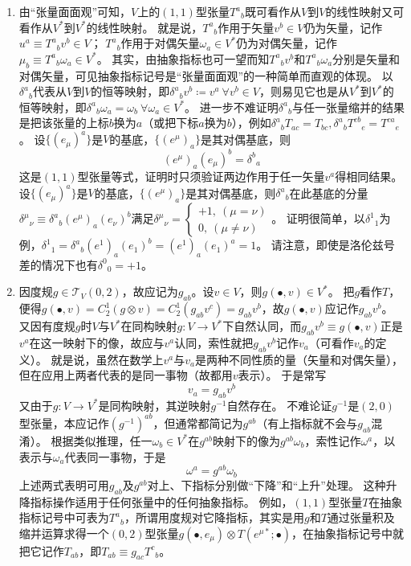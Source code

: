 \begin{enumerate}[1.]
\item 由``张量面面观''可知，$V$上的$(1, 1)$型张量$T^a{}_b$既可看作从$V$到$V$的线性映射又可看作从$V^*$到$V^*$的线性映射。
就是说，$T^a{}_b$作用于矢量$v^b \in V$仍为矢量，记作$u^a \equiv T^a{}_bv^b \in V$；
$T^a{}_b$作用于对偶矢量$\omega_a \in V^*$仍为对偶矢量，记作$\mu_b \equiv T^a{}_b\omega_a \in V^*$。
其实，由抽象指标也可一望而知$T^a{}_bv^b$和$T^a{}_b\omega_a$分别是矢量和对偶矢量，可见抽象指标记号是``张量面面观''的一种简单而直观的体现。
以$\delta^a{}_b$代表从$V$到$V$的恒等映射，即$\delta^a{}_bv^b \coloneq v^a ~ \forall v^b \in V$，则易见它也是从$V^*$到$V^*$的恒等映射，即$\delta^a{}_b\omega_a = \omega_b ~ \forall \omega_a \in V^*$。
进一步不难证明$\delta^a{}_b$与任一张量缩并的结果是把该张量的上标$b$换为$a$（或把下标$a$换为$b$），例如$\delta^a{}_bT_{ac} = T_{bc}, \delta^a{}_bT^{cb}{}_e = T^{ca}{}_e$。
设$\{(e_\mu)^a\}$是$V$的基底，$\{(e^\mu)_a\}$是其对偶基底，则
$$(e^\mu)_a(e_\mu)^b = \delta^b{}_a$$
这是$(1, 1)$型张量等式，证明时只须验证两边作用于任一矢量$v^a$得相同结果。
设$\{(e_\mu)^a\}$是$V$的基底，$\{(e^\mu)_a\}$是其对偶基底，则$\delta^a{}_b$在此基底的分量$\delta^\mu{}_\nu \equiv \delta^a{}_b(e^\mu)_a(e_\nu)^b$满足$\delta^\mu{}_\nu = \begin{cases}+1, ~ (\mu = \nu) \\0, ~ (\mu \neq \nu)\end{cases}$。
证明很简单，以$\delta^1{}_1$为例，$\delta^1{}_1 = \delta^a{}_b(e^1)_a(e_1)^b = (e^1)_a(e_1)^a = 1$。
请注意，即使是洛伦兹号差的情况下也有$\delta^0{}_0 = +1$。
\item 因度规$g \in \mathscr{T}_V(0, 2)$，故应记为$g_{ab}$。设$v \in V$，则$g(\bullet, v) \in V^*$。
把$g$看作$T$，便得$g(\bullet, v) = C^1_2(g \otimes v) = C^1_2(g_{ab}v^c) = g_{ab}v^b$，故$g(\bullet, v)$应记作$g_{ab}v^b$。
又因有度规$g$时$V$与$V^*$在同构映射$g \colon V \to V^*$下自然认同，而$g_{ab}v^b \equiv g(\bullet, v)$正是$v^a$在这一映射下的像，故应与$v^a$认同，索性就把$g_{ab}v^b$记作$v_a$（可看作$v_a$的定义）。
就是说，虽然在数学上$v^a$与$v_a$是两种不同性质的量（矢量和对偶矢量），但在应用上两者代表的是同一事物（故都用$v$表示）。
于是常写
$$v_a = g_{ab}v^b$$
又由于$g \colon V \to V^*$是同构映射，其逆映射$g^{-1}$自然存在。
不难论证$g^{-1}$是$(2, 0)$型张量，本应记作$(g^{-1})^{ab}$，但通常都简记为$g^{ab}$（有上指标就不会与$g_{ab}$混淆）。
根据类似推理，任一$\omega_b \in V^*$在$g^{ab}$映射下的像为$g^{ab}\omega_b$，索性记作$\omega^a$，以表示与$\omega_a$代表同一事物，于是
$$\omega^a = g^{ab}\omega_b$$
上述两式表明可用$g_{ab}$及$g^{ab}$对上、下指标分别做``下降''和``上升''处理。
这种升降指标操作适用于任何张量中的任何抽象指标。
例如，$(1, 1)$型张量$T$在抽象指标记号中可表为$T^a{}_b$，所谓用度规对它降指标，其实是用$g$和$T$通过张量积及缩并运算求得一个$(0, 2)$型张量$g(\bullet, e_\mu) \otimes T(e^{\mu*}; \bullet)$，在抽象指标记号中就把它记作$T_{ab}$，即$T_{ab} \equiv g_{ac}T^c{}_b$。
\end{enumerate}


